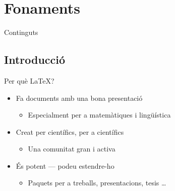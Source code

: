 

\subtitle{Primera part}



\begin{frame}
\titlepage
\end{frame}

\section{Fonaments}

\begin{frame}{Continguts}
\begin{multicols}{2}
\tableofcontents[currentsection]
\end{multicols}
\end{frame}

\subsection{Introducció}

\begin{frame}{Per què \LaTeX{}?}
\begin{itemize}
\item Fa documents amb una bona presentació
\begin{itemize}
\item Especialment per a matemàtiques i lingüística
\end{itemize}
%
\item Creat per científics, per a científics
\begin{itemize}
\item Una comunitat gran i activa
\end{itemize}
%
\item És potent --- podeu estendre-ho
\begin{itemize}
\item Paquets per a treballs, presentacions, tesis \dots
\end{itemize}
\end{itemize}
\end{frame}

